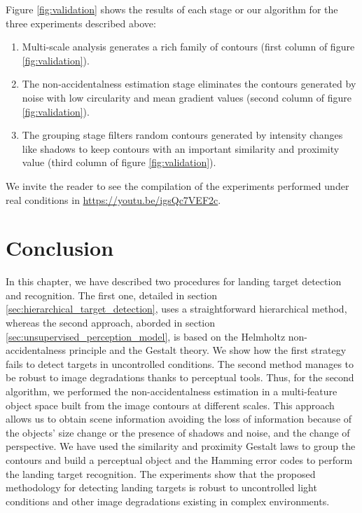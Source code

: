 Figure \ref{fig:validation} shows the results of each stage or our algorithm for the three experiments described above:

\begin{enumerate}
	\item Multi-scale analysis generates a rich family of contours (first column of figure \ref{fig:validation}).
	\item The non-accidentalness estimation stage eliminates the contours generated by noise with low circularity and mean gradient values (second column of figure \ref{fig:validation}).
	\item The grouping stage filters random contours generated by intensity changes like shadows to keep contours with an important similarity and proximity value (third column of figure \ref{fig:validation}).
\end{enumerate}
We invite the reader to see the compilation of the experiments performed under real conditions in \url{https://youtu.be/igsQc7VEF2c}.

\section{Conclusion}\label{sec:conclusions_landing_target}
In this chapter, we have described two procedures for landing target detection and recognition. The first one, detailed in section \ref{sec:hierarchical_target_detection}, uses a straightforward hierarchical method, whereas the second approach, aborded in section \ref{sec:unsupervised_perception_model}, is based on the Helmholtz non-accidentalness principle and the Gestalt theory. We show how the first strategy fails to detect targets in uncontrolled conditions. The second method manages to be robust to image degradations thanks to perceptual tools. Thus, for the second algorithm, we performed the non-accidentalness estimation in a multi-feature object space built from the image contours at different scales. This approach allows us to obtain scene information avoiding the loss of information because of the objects' size change or the presence of shadows and noise, and the change of perspective. We have used the similarity and proximity Gestalt laws to group the contours and build a perceptual object and the Hamming error codes to perform the landing target recognition. The experiments show that the proposed methodology for detecting landing targets is robust to uncontrolled light conditions and other image degradations existing in complex environments.

